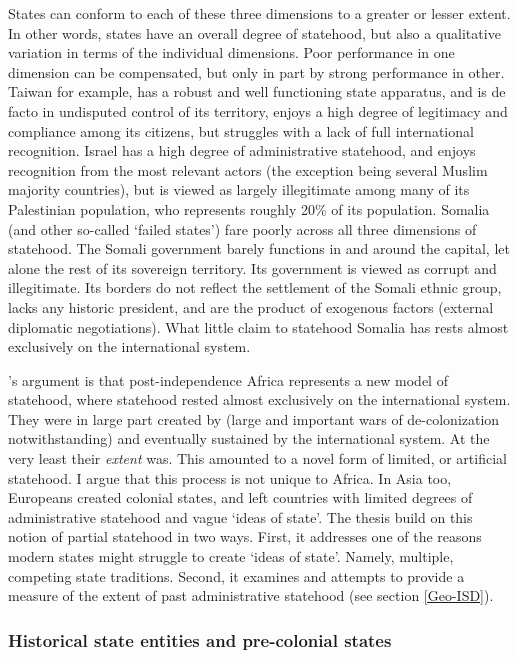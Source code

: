 States can conform to each of these three dimensions to a greater or lesser extent.
In other words, states have an overall degree of statehood, but also a
qualitative variation in terms of the individual dimensions. Poor performance in
one dimension can be compensated, but only in part by strong performance in other.
Taiwan for example, has a robust and well functioning state apparatus, and is de
facto in undisputed control of its territory, enjoys a high degree of legitimacy
and compliance among its citizens, but struggles with a lack of full
international recognition. Israel has a high degree of administrative statehood, and
enjoys recognition from the most relevant actors (the exception being several
Muslim majority countries), but is viewed as largely illegitimate among many of
its Palestinian population, who represents roughly 20\% of its population.
Somalia (and other so-called `failed states') fare poorly across all three
dimensions of statehood. The Somali government barely functions in and around the
capital, let alone the rest of its sovereign territory. Its government is
viewed as corrupt and illegitimate. Its borders do not reflect the settlement of
the Somali ethnic group, lacks any historic president, and are the product of
exogenous factors (external diplomatic negotiations). What little claim to
statehood Somalia has rests almost exclusively on the international system.

\citet{Clapham1996}'s argument is that post-independence Africa represents a new
model of statehood, where statehood rested almost exclusively on the
international system. They were in large part created by (large and important
wars of de-colonization notwithstanding) and eventually sustained by
the international system. At the very least their \textit{extent} was. This
amounted to a novel form of limited, or artificial statehood. I argue that this
process is not unique to Africa. In Asia too, Europeans created colonial states,
and left countries with limited degrees of administrative statehood and vague
`ideas of state'. The thesis build on this notion of partial statehood in two
ways. First, it addresses one of the reasons modern states might struggle to
create `ideas of state'. Namely, multiple, competing state traditions. Second,
it examines and attempts to provide a measure of the extent of past
administrative statehood (see section \ref{Geo-ISD}). 

\subsubsection{Historical state entities and pre-colonial states} 
\label{Historical state entities and Pre-colonial states}

